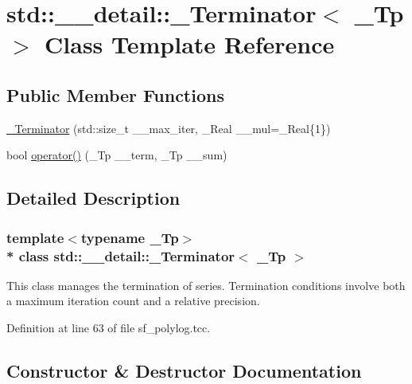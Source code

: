 \hypertarget{classstd_1_1____detail_1_1__Terminator}{}\section{std\+:\+:\+\_\+\+\_\+detail\+:\+:\+\_\+\+Terminator$<$ \+\_\+\+Tp $>$ Class Template Reference}
\label{classstd_1_1____detail_1_1__Terminator}
\subsection*{Public Member Functions}
\begin{DoxyCompactItemize}
\item 
\hyperlink{classstd_1_1____detail_1_1__Terminator_aee41e518162f472b6e62a5477f3256d4}{\+\_\+\+Terminator} (std\+::size\+\_\+t \+\_\+\+\_\+max\+\_\+iter, \+\_\+\+Real \+\_\+\+\_\+mul=\+\_\+\+Real\{1\})
\item 
bool \hyperlink{classstd_1_1____detail_1_1__Terminator_a6c69c623075f36692ae86dd65b9c4a5c}{operator()} (\+\_\+\+Tp \+\_\+\+\_\+term, \+\_\+\+Tp \+\_\+\+\_\+sum)
\end{DoxyCompactItemize}


\subsection{Detailed Description}
\subsubsection*{template$<$typename \+\_\+\+Tp$>$\\*
class std\+::\+\_\+\+\_\+detail\+::\+\_\+\+Terminator$<$ \+\_\+\+Tp $>$}

This class manages the termination of series. Termination conditions involve both a maximum iteration count and a relative precision. 

Definition at line 63 of file sf\+\_\+polylog.\+tcc.



\subsection{Constructor \& Destructor Documentation}
